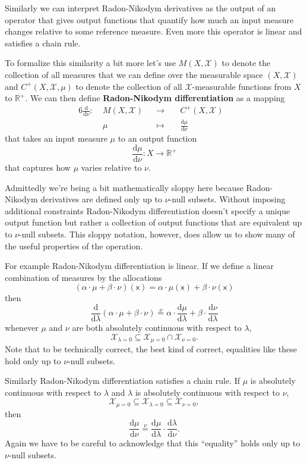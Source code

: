 \documentclass[
  letterpaper,
  DIV=11,
  numbers=noendperiod]{scrartcl}
\begin{document}
Similarly we can interpret Radon-Nikodym derivatives as the output of an
operator that gives output functions that quantify how much an input
measure changes relative to some reference measure. Even more this
operator is linear and satisfies a chain rule.

To formalize this similarity a bit more let's use \(M(X, \mathcal{X})\)
to denote the collection of all measures that we can define over the
measurable space \((X, \mathcal{X})\) and \(C^{+}(X, \mathcal{X}, \mu)\)
to denote the collection of all \(\mathcal{X}\)-measurable functions
from \(X\) to \(\mathbb{R}^{+}\). We can then define
\textbf{Radon-Nikodym differentiation} as a mapping \begin{alignat*}{6}
\frac{ \mathrm{d} }{ \mathrm{d} \nu } :\; & M(X, \mathcal{X}) & &\rightarrow& \;
& C^{+}(X, \mathcal{X}) &
\\
& \mu & &\mapsto& & \frac{ \mathrm{d} \mu }{ \mathrm{d} \nu } &
\end{alignat*} that takes an input measure \(\mu\) to an output function
\[
\frac{ \mathrm{d} \mu }{ \mathrm{d} \nu } : X \rightarrow \mathbb{R}^{+}
\] that captures how \(\mu\) varies relative to \(\nu\).

Admittedly we're being a bit mathematically sloppy here because
Radon-Nikodym derivatives are defined only up to \(\nu\)-null subsets.
Without imposing additional constraints Radon-Nikodym differentiation
doesn't specify a unique output function but rather a collection of
output functions that are equivalent up to \(\nu\)-null subsets. This
sloppy notation, however, does allow us to show many of the useful
properties of the operation.

For example Radon-Nikodym differentiation is linear. If we define a
linear combination of measures by the allocations \[
(\alpha \cdot \mu + \beta \cdot \nu)(\mathsf{x})
=
\alpha \cdot \mu(\mathsf{x}) + \beta \cdot \nu(\mathsf{x})
\] then \[
\frac{ \mathrm{d} }{ \mathrm{d} \lambda }
(\alpha \cdot \mu + \beta \cdot \nu)
\overset{\nu}{=}
\alpha \cdot \frac{ \mathrm{d} \mu}{ \mathrm{d} \lambda }
+ \beta \cdot \frac{ \mathrm{d} \nu }{ \mathrm{d} \lambda }
\] whenever \(\mu\) and \(\nu\) are both absolutely continuous with
respect to \(\lambda\), \[
\mathcal{X}_{\lambda = 0} \subseteq
\mathcal{X}_{\mu = 0} \cap \mathcal{X}_{\nu = 0}.
\] Note that to be technically correct, the best kind of correct,
equalities like these hold only up to \(\nu\)-null subsets.

Similarly Radon-Nikodym differentiation satisfies a chain rule. If
\(\mu\) is absolutely continuous with respect to \(\lambda\) and
\(\lambda\) is absolutely continuous with respect to \(\nu\), \[
\mathcal{X}_{\mu = 0}
\subseteq \mathcal{X}_{\lambda = 0}
\subseteq \mathcal{X}_{\nu = 0},
\] then \[
\frac{ \mathrm{d} \mu}{ \mathrm{d} \nu}
\overset{\nu}{=}
\frac{ \mathrm{d} \mu}{ \mathrm{d} \lambda } \cdot
\frac{ \mathrm{d} \lambda}{ \mathrm{d} \nu }.
\] Again we have to be careful to acknowledge that this ``equality''
holds only up to \(\nu\)-null subsets.
\end{document}
